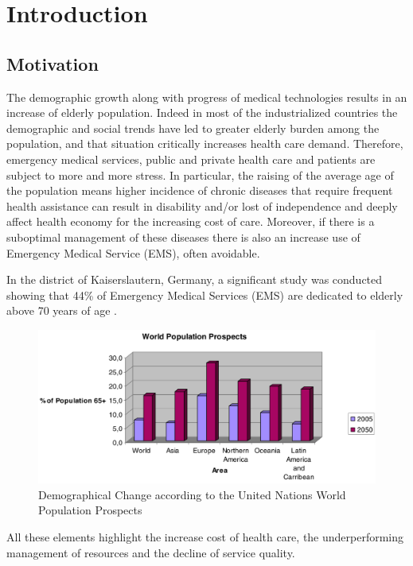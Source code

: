 \documentclass{thesisreport}
\begin{document}
 \tableofcontents
 
 
 \chapter{Introduction}

\section{Motivation}
  The demographic growth along with progress of medical technologies results in an increase of elderly population. Indeed in most of the industrialized countries the demographic and social trends have led to greater elderly burden among the population, and that situation critically increases health care demand. Therefore, emergency medical services, public and private health care and patients are subject to more and more stress. 
  In particular, the raising of the average age of the population means higher incidence of chronic diseases that require frequent health assistance can result in disability and/or lost of independence and deeply affect health economy for the increasing cost of care. Moreover, if there is a suboptimal management of these diseases there is also an increase use of Emergency Medical Service (EMS), often avoidable.
 
 In the district of Kaiserslautern, Germany, a significant study was conducted showing that 44\% of Emergency Medical Services (EMS) are dedicated to elderly above 70 years of age \cite{kleinberger2007ambient}.
 	\begin{figure}[H]
		\centering
		\includegraphics[width=15cm]{Thesis/data/populationProspect.png}
		\caption{\small{Demographical Change according to the United Nations World Population Prospects \cite{kleinberger2007ambient}}}
		\label{fig:populationProspect}
	\end{figure}
 All these elements highlight the increase cost of health care, the underperforming management of resources and the decline of service quality.
 
\end{document}
